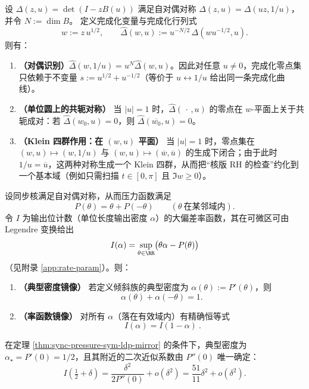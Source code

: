 \begin{remark}\label{prop:completed-zero-symmetry}
设 \(\Delta(z,u)=\det(I-zB(u))\) 满足自对偶对称 \(\Delta(z,u)=\Delta(uz,1/u)\)，并令 \(N:=\dim B\)。
定义完成化变量与完成化行列式
\[
w:=z\,u^{1/2},\qquad
\widehat{\Delta}(w,u):=u^{-N/2}\,\Delta(wu^{-1/2},u).
\]
则有：
\begin{enumerate}
  \item \textbf{（对偶识别）}\(\widehat{\Delta}(w,1/u)=u^{N}\widehat{\Delta}(w,u)\)。因此对任意 \(u\neq 0\)，完成化零点集只依赖于不变量
  \(s:=u^{1/2}+u^{-1/2}\)（等价于 \(u\leftrightarrow 1/u\) 给出同一条完成化曲线）。
  \item \textbf{（单位圆上的共轭对称）} 当 \(|u|=1\) 时，\(\widehat{\Delta}(\,\cdot\,,u)\) 的零点在 \(w\)-平面上关于共轭成对：若 \(\widehat{\Delta}(w_0,u)=0\)，则 \(\widehat{\Delta}(\overline{w_0},u)=0\)。
  \item \textbf{（Klein 四群作用：在 \((w,u)\) 平面）} 当 \(|u|=1\) 时，零点集在
  \((w,u)\mapsto (w,1/u)\) 与 \((w,u)\mapsto(\overline{w},\overline{u})\) 的生成下闭合；由于此时 \(1/u=\overline{u}\)，这两种对称生成一个 Klein 四群，从而把“核版 RH 的检查”约化到一个基本域（例如只需扫描 \(t\in[0,\pi]\) 且 \(\Im w\ge 0\)）。
\end{enumerate}
\end{remark}

\begin{remark}[压力对称 \texorpdfstring{$\Rightarrow$}{=>} 大偏差谱的精确镜像]\label{thm:sync-pressure-sym-ldp-mirror}
设同步核满足自对偶对称，从而压力函数满足
\[
P(\theta)=\theta+P(-\theta)
\qquad(\theta\ \text{在某邻域内}).
\]
令 \(I\) 为输出位计数（单位长度输出密度 \(\alpha\)）的大偏差率函数，其在可微区可由 Legendre 变换给出
\[
I(\alpha)=\sup_{\theta\in\RR}\bigl(\theta\alpha-P(\theta)\bigr)
\]
（见附录 \ref{app:rate-param}）。则：
\begin{enumerate}
  \item \textbf{（典型密度镜像）} 若定义倾斜族的典型密度为 \(\alpha(\theta):=P'(\theta)\)，则
  \[
  \alpha(\theta)+\alpha(-\theta)=1.
  \]
  \item \textbf{（率函数镜像）} 对所有 \(\alpha\)（落在有效域内）有精确恒等式
  \[
  \boxed{\ I(\alpha)=I(1-\alpha)\ }.
  \]
\end{enumerate}
\end{remark}

\begin{remark}\label{cor:sync-ldp-quadratic-locked}
在定理 \ref{thm:sync-pressure-sym-ldp-mirror} 的条件下，典型密度为 \(\alpha_\star=P'(0)=1/2\)，且其附近的二次近似系数由 \(P''(0)\) 唯一确定：
\[
I\!\left(\tfrac12+\delta\right)=\frac{\delta^2}{2P''(0)}+o(\delta^2)
=\frac{51}{11}\delta^2+o(\delta^2).
\]
\end{remark}

